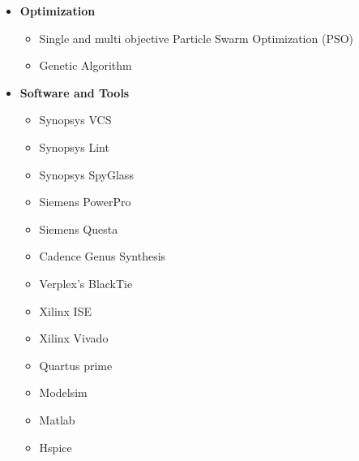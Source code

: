 \begin {itemize}
\begin {itemize}
\begin {itemize}
                            \item [-] Cortex M0
                            \item [-] Ethos U65
                            \item [-] Zilog Z80
                            \item [-] Arduino
                            \item [-] Raspberry Pi.
                            \item [-] 8051 Microcontroller
                            \item [-] AXI Interconnect
                    \end {itemize} 
               \item [$\bullet$] \bf {\mtf \normalsize  Optimization} \mdseries 
                     \begin {itemize}
                            \item [-] Single and multi objective Particle Swarm  Optimization (PSO)
                            \item [-] Genetic Algorithm
                    \end {itemize} 
               \item [$\bullet$] \bf {\mtf \normalsize  Software and Tools} \mdseries 
                      \begin {itemize}
                            \item [-] Synopsys VCS
                            \item [-] Synopsys Lint
                            \item [-] Synopsys SpyGlass
                            \item [-] Siemens PowerPro
                            \item [-] Siemens Questa
                            \item [-] Cadence Genus Synthesis
                            \item [-] Verplex's BlackTie
                            \item [-] Xilinx ISE
                            \item [-] Xilinx Vivado
                            \item [-] Quartus prime
                            \item [-] Modelsim
                            \item [-] Matlab
                            \item [-] Hspice

\end{itemize}
\end{itemize}
\end{itemize}
